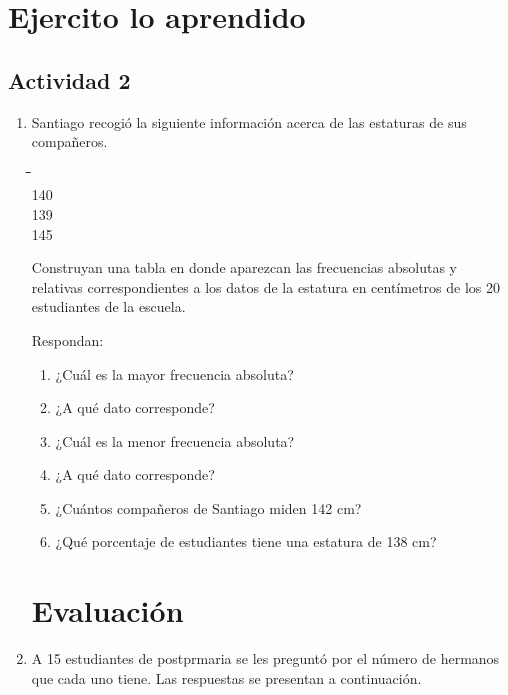 \documentclass[10pt,twoside]{article}
\begin{document}
\section*{Ejercito lo aprendido}
\subsection*{Actividad 2}
\begin{enumerate}
\item Santiago recogi\'{o} la siguiente informaci\'{o}n acerca de las estaturas de sus compañeros.
\begin{center}
\begin{tabbing}
\hspace{1.5cm}\=\hspace{1.5cm}\=\hspace{1.5cm}\=\hspace{1.5cm}\=    \\ 
140     \\ 
139    \\ 
145    
\end{tabbing} 
\end{center}
Construyan una tabla en donde aparezcan las frecuencias absolutas y relativas correspondientes a los datos de la estatura en centímetros de los 20 estudiantes de la escuela.

Respondan:
\begin{enumerate}
\item ¿Cuál es la mayor frecuencia absoluta?
\item ¿A qué dato corresponde?
\item ¿Cuál es la menor frecuencia absoluta?
\item ¿A qué dato corresponde?
\item ¿Cuántos compañeros de Santiago miden 142 cm?
\item ¿Qué porcentaje de estudiantes tiene una estatura de 138 cm?
\end{enumerate}
\section*{Evaluaci\'{o}n}
\item A 15 estudiantes de postprmaria se les preguntó por el número de hermanos que cada uno tiene. Las respuestas se presentan a continuación.\\


\end{enumerate}
\end{document}

